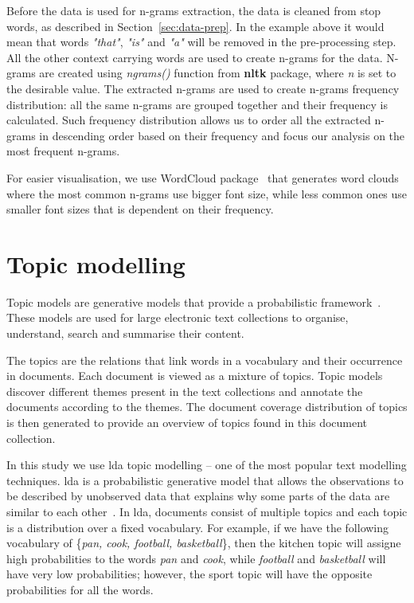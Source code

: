 Before the data is used for n-grams extraction, the data is cleaned from stop words, as described in Section~\ref{sec:data-prep}. In the example above it would mean that words \textit{"that"}, \textit{"is"} and \textit{"a"} will be removed in the pre-processing step. All the other context carrying words are used to create n-grams for the data. N-grams are created using \textit{ngrams()} function from \textbf{nltk} package, where \textit{n} is set to the desirable value. The extracted n-grams are used to create n-grams frequency distribution: all the same n-grams are grouped together and their frequency is calculated. Such frequency distribution allows us to order all the extracted n-grams in descending order based on their frequency and focus our analysis on the most frequent n-grams. 

For easier visualisation, we use WordCloud package~\cite{wordcloud} that generates word clouds where the most common n-grams use bigger font size, while less common ones use smaller font sizes that is dependent on their frequency.

\section{Topic modelling}
Topic models are generative models that provide a probabilistic framework~\cite{topic-model}. These models are used for large electronic text collections to organise, understand, search and summarise their content. 

The topics are the relations that link words in a vocabulary and their occurrence in documents. Each document is viewed as a mixture of topics. Topic models discover different themes present in the text collections and annotate the documents according to the themes. The document coverage distribution of topics is then generated to provide an overview of topics found in this document collection. 

In this study we use \gls{lda} topic modelling -- one of the most popular text modelling techniques. \gls{lda} is a probabilistic generative model that allows the observations to be described by unobserved data that explains why some parts of the data are similar to each other~\cite{tong-topic-modelling}. In \gls{lda}, documents consist of multiple topics and each topic is a distribution over a fixed vocabulary. For example, if we have the  following vocabulary of \{\textit{pan, cook, football, basketball}\}, then the kitchen topic will assigne high probabilities to the words \textit{pan} and \textit{cook}, while \textit{football} and \textit{basketball} will have very low probabilities; however, the sport topic will have the opposite probabilities for all the words. 

